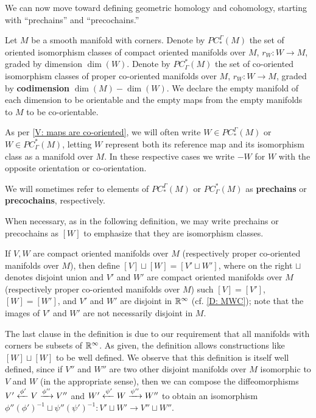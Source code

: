 We can now move toward defining geometric homology and cohomology, starting with ``prechains'' and ``precochains.''

\begin{definition}
	Let $M$ be a smooth manifold with corners.
	Denote by $PC^\Gamma_*(M)$ the set of oriented isomorphism classes of compact oriented manifolds over $M$, $r_W \colon W \to M$,
	graded by dimension $\dim(W)$.
	Denote by $PC_\Gamma^*(M)$ the set of co-oriented isomorphism classes of proper co-oriented manifolds over $M$, $r_W \colon W \to M$,
	graded by \textbf{codimension} $\dim(M) - \dim(W)$.
	We declare the empty manifold of each dimension to be orientable and the empty maps from the empty manifolds to $M$ to be co-orientable.

	As per \cref{V: maps are co-oriented}, we will often write $W \in PC^\Gamma_*(M)$ or $W \in PC_\Gamma^*(M)$, letting $W$ represent both its reference map and its isomorphism class as a manifold over $M$.
	In these respective cases we write $-W$ for $W$ with the opposite orientation or co-orientation.

	We will sometimes refer to elements of $PC^\Gamma_*(M)$ or $PC_\Gamma^*(M)$ as \textbf{prechains} or \textbf{precochains}, respectively.
\end{definition}

When necessary, as in the following definition, we may write prechains or precochains as $[W]$ to emphasize that they are isomorphism classes.


\begin{definition}\label{D: prechain sum}
	If $V,W$ are compact oriented manifolds over $M$ (respectively proper co-oriented manifolds over $M$), then define $[V] \sqcup [W] = [V' \sqcup W']$, where on the right $\sqcup$ denotes disjoint union and $V'$ and $W'$ are compact oriented manifolds over $M$ (respectively proper co-oriented manifolds over $M$) such $[V]=[V']$, $[W]=[W']$, and $V'$ and $W'$ are disjoint in $\mathbb{R}^\infty$ (cf.
	\cref{D: MWC}); note that the images of $V'$ and $W'$ are not necessarily disjoint in $M$.
\end{definition}

The last clause in the definition is due to our requirement that all manifolds with corners be subsets of $\mathbb{R}^\infty$.
As given, the definition allows constructions like $[W]\sqcup[W]$ to be well defined.
We observe that this definition is itself well defined, since if $V''$ and $W''$ are two other disjoint manifolds over $M$ isomorphic to $V$ and $W$ (in the appropriate sense), then we can compose the diffeomorphisms $V'\xleftarrow{\phi'}V \xrightarrow{\phi''} V''$ and $W'\xleftarrow{\psi'}W \xrightarrow{\psi''} W''$ to obtain an isomorphism $\phi''(\phi')^{-1} \sqcup \psi''(\psi')^{-1} \colon V' \sqcup W' \to V'' \sqcup W''$.

